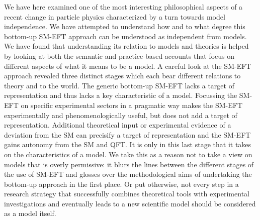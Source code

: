 We have here examined one of the most interesting philosophical aspects of a recent change in particle physics characterized by a turn towards model independence. 
We have attempted to understand how and to what degree this bottom-up SM-EFT approach can be understood as independent from models. 
We have found that understanding its relation to models and theories is helped by looking at both the semantic and practice-based accounts that focus on different aspects of what it means to be a model. 
A careful look at the SM-EFT approach revealed three distinct stages which each bear different relations to theory and to the world. 
The generic bottom-up SM-EFT lacks a target of representation and thus lacks a key characteristic of a model. Focussing the SM-EFT on specific experimental sectors in a pragmatic way makes the SM-EFT experimentally and phenomenologically useful, but does not add a target of representation. Additional theoretical input or experimental evidence of a deviation from the SM can precisify a target of representation and the SM-EFT gains autonomy from the SM and QFT. It is only in this last stage that it takes on the characteristics of a model.
We take this as a reason not to take a view on models that is overly permissive: it blurs the lines between the different stages of the use of SM-EFT and glosses over the methodological aims of undertaking the bottom-up approach in the first place. 
Or put otherwise, not every step in a research strategy that successfully combines theoretical tools with experimental investigations and eventually leads to a new scientific model should be considered as a model itself.









